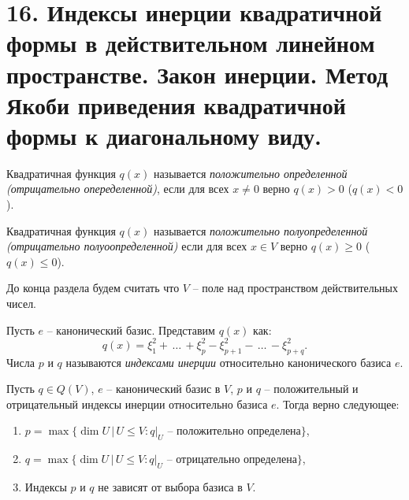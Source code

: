 \section{16. Индексы инерции квадратичной формы в действительном линейном пространстве. Закон инерции. Метод Якоби приведения квадратичной формы к диагональному виду.}

\begin{definition}
    Квадратичная функция $q(x)$ называется \textit{положительно определенной (отрицательно опеределенной)}, 
    если для всех $x \neq 0$ верно $q(x) > 0$ ($q(x) < 0$).
\end{definition}

\begin{definition}
    Квадратичная функция $q(x)$ называется \textit{положительно полуопределенной (отрицательно полуоопределенной)} 
    если для всех $x \in V$ верно $q(x) \geq 0$ ($q(x) \leq 0$).
\end{definition}

\begin{agreement}
    До конца раздела будем считать что $V$ -- поле над пространством действительных чисел.
\end{agreement}

\begin{definition}
    Пусть $e$ -- канонический базис. Представим $q(x)$ как: 
    $$q(x) = \xi_1^2 + \, \dots \,+ \xi_p^2 - \xi^2_{p+1} - \, \dots \,- \xi^2_{p+q}.$$ 
    Числа $p$ и $q$ называются \textit{индексами инерции} относительно канонического базиса $e$.
\end{definition}

\begin{theorem}
    Пусть $q \in Q(V)$, $e$ -- канонический базис в $V$, $p$ и $q$ -- положительный и отрицательный 
    индексы инерции относительно базиса $e$. Тогда верно следующее: 
    \begin{enumerate}
        \item $p = \max\{\dim U \, \vert \, U \leq V : q \vert_{U} \text{ -- положительно определена}\}$,
        \item $q = \max\{\dim U \, \vert \, U \leq V : q \vert_{U} \text{ -- отрицательно определена}\}$,
        \item Индексы $p$ и $q$ не зависят от выбора базиса в $V$.
    \end{enumerate}
\end{theorem}

